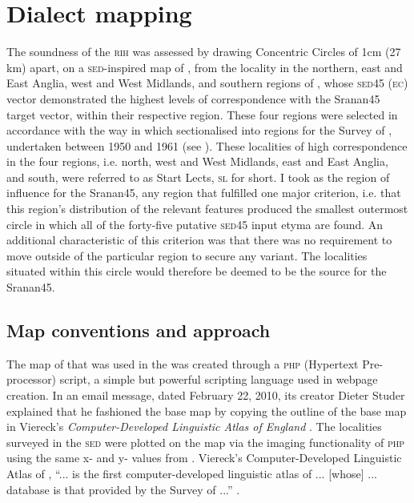 \section{Dialect mapping}\label{5.4}
The soundness of the \textsc{rih} was assessed by drawing Concentric Circles of 1cm (27 km) apart, on a \textsc{\textsc{sed}}-inspired map of , from the locality in the northern, east and East Anglia, west and West Midlands, and southern regions of , whose \textsc{sed45} (\textsc{ec}) vector demonstrated the highest levels of correspondence with the Sranan45 target vector, within their respective region. These four regions were selected in accordance with the way in which \citet{Orton6271} sectionalised  into regions for the Survey of  , undertaken between 1950 and 1961 (see ). These localities of high correspondence in the four regions, i.e. north, west and West Midlands, east and East Anglia, and south, were referred to as Start Lects, \textsc{sl} for short. I took as the region of influence for the Sranan45, any region that fulfilled one major criterion, i.e. that this region's distribution of the relevant features produced the smallest outermost circle in which all of the forty-five putative \textsc{sed45} input etyma are found. An additional characteristic of this criterion was that there was no requirement to move outside of the particular region to secure any variant. The localities situated within this circle would therefore be deemed to be the  source for the Sranan45.

\subsection{Map conventions and approach}\label{5.4.1}
The map of  that was used in the  was created through a \textsc{php} (Hypertext Pre-processor) script, a simple but powerful scripting language used in webpage creation. In an email message, dated February 22, 2010, its creator Dieter Studer explained that he fashioned the base map by copying the outline of the base map in Viereck's  \emph{Computer-Developed Linguistic Atlas of England} \citep{Viereck90}. The localities surveyed in the \textsc{\textsc{sed}} were plotted on the map via the imaging functionality of \textsc{php} using the same x- and y- values from \citet{Viereck90}. Viereck's Computer-Developed Linguistic Atlas of , ``... is the first computer-developed linguistic atlas of ... [whose] ... database is that provided by the Survey of   ...'' \citep[79]{Viereck97}.

